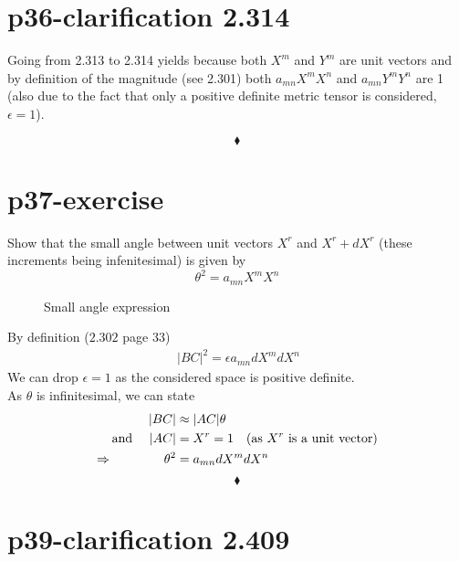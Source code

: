 \section{p36-clarification 2.314}
\begin{tcolorbox}
Going from 2.313 to 2.314 yields because both $X^m$ and $Y^m$ are unit vectors and by definition of the magnitude (see 2.301) both  $a_{mn}X^mX^n$ and $a_{mn}Y^mY^n$ are 1 (also due to the fact that only a positive definite metric tensor is considered, $\epsilon = 1$).
\end{tcolorbox}
$$\blacklozenge$$
\newpage

\section{p37-exercise}

\begin{tcolorbox}
Show that the small angle between unit vectors $X^r$ and $X^r + dX^r$ (these increments being infenitesimal) is given by $$ \theta^2 = a_{mn}X^mX^n$$
\end{tcolorbox}
\begin{figure}[htp]  

    \centering
 

\caption{Small angle expression}
\end{figure}
By definition ($\mathbf{2.302}$ page 33)
\begin{align*} 
\ |BC|^2 =\epsilon a_{mn}dX^mdX^n
\end{align*}
We can drop $\epsilon = 1$ as the considered space is positive definite.\\
As $\theta$ is infinitesimal, we can state
\begin{align*}
\ |BC| &\approx |AC|\theta\\
\text{ and } \quad |AC| &= X^r = 1\quad  \text{(as } X^r \text{ is a unit vector)}\\
\Rightarrow \quad\quad\quad\quad \theta^2 &= a_{mn}dX^mdX^n
\end{align*}
$$\blacklozenge$$
\newpage


\section{p39-clarification 2.409}

